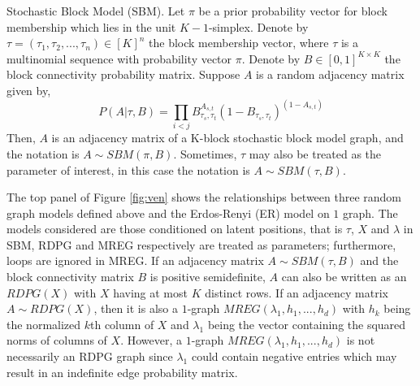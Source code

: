 \documentclass[10pt,journal,compsoc]{IEEEtran}
\newenvironment{definition}[1][Definition]{\begin{trivlist}
		\item[\hskip \labelsep {\bfseries #1}]}{\end{trivlist}}
\begin{document}
\begin{definition} Stochastic Block Model (SBM). Let $\pi$ be a prior probability vector for block membership which lies in the unit $K-1$-simplex. Denote by $\tau=(\tau_1,\tau_2,...,\tau_n) \in [K]^n$ the block membership vector, where $\tau$ is a multinomial sequence with probability vector $\pi$.
Denote by $B \in [0,1]^{K \times K}$ the block connectivity probability matrix. Suppose $A$ is a random adjacency matrix given by,
\[ P(A|\tau,B)= \prod_{i<j} B_{\tau_s,\tau_t}^{A_{s,t}} (1-B_{\tau_s,\tau_t})^{(1-A_{s,t})}\] 
Then, $A$ is an adjacency matrix of a K-block stochastic block model graph, and the notation is $A \sim SBM(\pi,B)$. Sometimes, $\tau$ may also be treated as the parameter of interest, in this case the notation is $A \sim SBM(\tau,B)$.
\end{definition}

\noindent The top panel of Figure \ref{fig:ven} shows the relationships between three random graph models defined above and the Erdos-Renyi (ER) model on $1$ graph. The models considered are those conditioned on latent positions, that is $\tau$, $X$ and $\lambda$ in SBM, RDPG and MREG respectively are treated as parameters; furthermore, loops are ignored in MREG. If an adjacency matrix $A \sim SBM(\tau,B)$ and the block connectivity matrix $B$ is positive semidefinite, $A$ can also be written as an $RDPG(X)$ with $X$ having at most $K$ distinct rows. If an adjacency matrix $A \sim RDPG(X)$, then it is also a $1$-graph $MREG(\lambda_1,h_1,...,h_d)$ with $h_k$ being the normalized $k$th column of $X$ and $\lambda_1$ being the vector containing the squared norms of columns of $X$. However, a $1$-graph $MREG(\lambda_1,h_1,...,h_d)$ is not necessarily an RDPG graph since $\lambda_1$ could contain negative entries which may result in an indefinite edge probability matrix. \\
\end{document}
